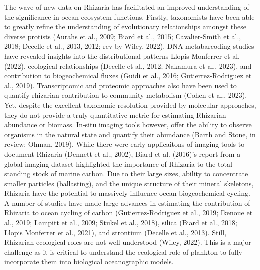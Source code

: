 \documentclass[
  letterpaper,
  DIV=11,
  numbers=noendperiod]{scrartcl}
\begin{document}
The wave of new data on Rhizaria has facilitated an improved
understanding of the significance in ocean ecosystem functions. Firstly,
taxonomists have been able to greatly refine the understanding of
evolutionary relationships amongst these diverse protists (Aurahs et
al., 2009; Biard et al., 2015; Cavalier-Smith et al., 2018; Decelle et
al., 2013, 2012; rev by Wiley, 2022). DNA metabarcoding studies have
revealed insights into the distributional patterns Llopis Monferrer et
al. (2022), ecological relationships (Decelle et al., 2012; Nakamura et
al., 2023), and contribution to biogeochemical fluxes (Guidi et al.,
2016; Gutierrez-Rodriguez et al., 2019). Transcriptomic and proteomic
approaches also have been used to quantify rhizarian contribution to
community metabolism (Cohen et al., 2023). Yet, despite the excellent
taxonomic resolution provided by molecular approaches, they do not
provide a truly quantitative metric for estimating Rhizarian abundance
or biomass. In-situ imaging tools however, offer the ability to observe
organisms in the natural state and quantify their abundance (Barth and
Stone, in review; Ohman, 2019). While there were early applicaitons of
imaging tools to document Rhizaria (Dennett et al., 2002), Biard et al.
(2016)'s report from a global imaging dataset highlighted the importance
of Rhizaria to the total standing stock of marine carbon. Due to their
large sizes, ability to concentrate smaller particles (ballasting), and
the unique structure of their mineral skeletons, Rhizaria have the
potential to massively influence ocean biogeochemical cycling. A number
of studies have made large advances in estimating the contribution of
Rhizaria to ocean cycling of carbon (Gutierrez-Rodriguez et al., 2019;
Ikenoue et al., 2019; Lampitt et al., 2009; Stukel et al., 2018), silica
(Biard et al., 2018; Llopis Monferrer et al., 2021), and strontium
(Decelle et al., 2013). Still, Rhizarian ecological roles are not well
understood (Wiley, 2022). This is a major challenge as it is critical to
understand the ecological role of plankton to fully incorporate them
into biological oceanographic models.
\end{document}
